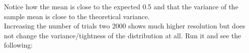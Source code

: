 \begin{fullwidth}

Notice how the mean is close to the expected 0.5 and that the variance of the sample mean is close to the theoretical variance.\\

\step Increasing the number of trials two 2000 shows much higher resolution but does not change the variance/tightness of the distribution at all. Run it and see the following:



\end{fullwidth}
